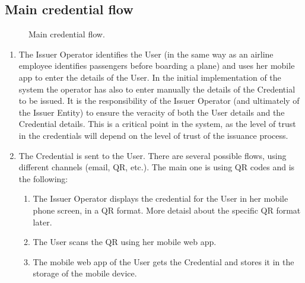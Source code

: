 \documentclass[a4paper,12pt,english,openany]{sphinxmanual}
\begin{document}
\subsection{Main credential flow}
\label{\detokenize{privacycred:main-credential-flow}}
\begin{figure}[htbp]
\centering
\capstart

\noindent{}
\caption{Main credential flow.}\label{\detokenize{privacycred:id3}}\end{figure}
\begin{enumerate}
%
\item {} 
\sphinxAtStartPar
{}

\sphinxAtStartPar
The Issuer Operator identifies the User (in the same way as an airline employee identifies passengers before boarding a plane) and uses her mobile app to enter the details of the User. In the initial implementation of the system the operator has also to enter manually the details of the Credential to be issued. It is the responsibility of the Issuer Operator (and ultimately of the Issuer Entity) to ensure the veracity of both the User details and the Credential details. This is a critical point in the system, as the level of trust in the credentials will depend on the level of trust of the issuance process.

\item {} 
\sphinxAtStartPar
{}

\sphinxAtStartPar
The Credential is sent to the User. There are several possible flows, using different channels (email, QR, etc.). The main one is using QR codes and is the following:
\begin{enumerate}
%
\item {} 
\sphinxAtStartPar
The Issuer Operator displays the credential for the User in her mobile phone screen, in a QR format. More detaisl about the specific QR format later.

\item {} 
\sphinxAtStartPar
The User scans the QR using her mobile web app.

\item {} 
\sphinxAtStartPar
The mobile web app of the User gets the Credential and stores it in the storage of the mobile device.


\end{enumerate}
\end{enumerate}
\end{document}
